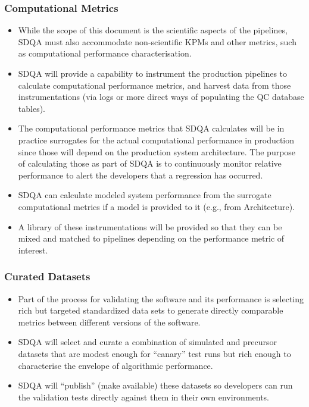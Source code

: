 \documentclass[DM,toc,lsstdraft]{lsstdoc}
\begin{document}
\subsubsection{Computational Metrics}
\label{sec:qaComputational}
\begin{itemize}

\item While the scope of this document is the scientific aspects of the pipelines, SDQA must also accommodate non-scientific KPMs and other metrics, such as computational performance characterisation.

\item SDQA will provide a capability to instrument the production pipelines to calculate computational performance metrics, and harvest data from those instrumentations (via logs or more direct ways of populating the QC database tables).

\item The computational performance metrics that SDQA calculates will be in practice surrogates for the actual computational performance in production since those will depend on the production system architecture. The purpose of calculating those as part of SDQA is to continuously monitor relative performance to alert the developers that a regression has occurred.

\item SDQA can calculate modeled system performance from the surrogate computational metrics if a model is provided to it (e.g., from Architecture).

\item A library of these instrumentations will be provided so that they can be mixed and matched to pipelines depending on the performance metric of interest.

\end{itemize}

\subsubsection{Curated Datasets}
\label{sec:qaCurateddata}
\begin{itemize}

\item Part of the process for validating the software and its performance is selecting rich but targeted standardized data sets to generate directly comparable metrics between different versions of the software.

\item SDQA will select and curate a combination of simulated and precursor datasets that are modest enough for ``canary'' test runs but rich enough to characterise the envelope of algorithmic performance.

\item SDQA will ``publish'' (make available) these datasets so developers can run the validation tests directly against them in their own environments.

\end{itemize}
\end{document}
